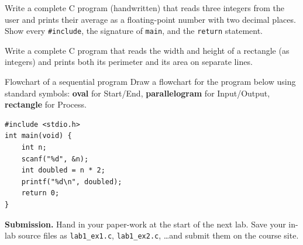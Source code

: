 \documentclass[11pt]{article}
\begin{document}
\begin{writecode}
Write a complete C program (handwritten) that reads three integers from the user
and prints their average as a floating-point number with two decimal places.
Show every \texttt{\#include}, the signature of \texttt{main}, and the \texttt{return} statement.
\end{writecode}

\begin{writecode}
Write a complete C program that reads the width and height of a rectangle
(as integers) and prints both its perimeter and its area on separate lines.
\end{writecode}

\begin{drawex}{Flowchart of a sequential program}
Draw a flowchart for the program below using standard symbols:
\textbf{oval} for Start/End, \textbf{parallelogram} for Input/Output, \textbf{rectangle} for Process.
\begin{lstlisting}
#include <stdio.h>
int main(void) {
    int n;
    scanf("%d", &n);
    int doubled = n * 2;
    printf("%d\n", doubled);
    return 0;
}
\end{lstlisting}
\end{drawex}

\vspace{4pt}
\noindent\textbf{Submission.} Hand in your paper-work at the start of the next lab.
Save your in-lab source files as \texttt{lab1\_ex1.c}, \texttt{lab1\_ex2.c}, \ldots and submit them on the course site.
\end{document}
